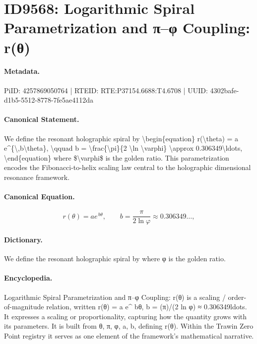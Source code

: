 \section*{ID9568: Logarithmic Spiral Parametrization and π–φ Coupling: r(θ)}
\paragraph{Metadata.}
PiID: 4257869050764 | RTEID: RTE:P37154.6688:T4.6708 | UUID: 4302bafe-d1b5-5512-8778-7fe5ae4112da

\paragraph{Canonical Statement.}
We define the resonant holographic spiral by \textbackslash{}begin\{equation\} r(\textbackslash{}theta) = a e\textasciicircum{}\{\textbackslash{},b\textbackslash{}theta\}, \textbackslash{}qquad b = \textbackslash{}frac\{\textbackslash{}pi\}\{2 \textbackslash{}ln \textbackslash{}varphi\} \textbackslash{}approx 0.306349\textbackslash{}ldots, \textbackslash{}end\{equation\} where \$\textbackslash{}varphi\$ is the golden ratio. This parametrization encodes the Fibonacci-to-helix scaling law central to the holographic dimensional resonance framework.

\paragraph{Canonical Equation.}
\[
r(\theta) = a e^{\,b\theta}, \qquad b = \frac{\pi}{2 \ln \varphi} \approx 0.306349\ldots,
\]

\paragraph{Dictionary.}
We define the resonant holographic spiral by where φ is the golden ratio.

\paragraph{Encyclopedia.}
Logarithmic Spiral Parametrization and π–φ Coupling: r(θ) is a scaling / order-of-magnitude relation, written r(θ) = a e\textasciicircum{} bθ, b = (π)/(2 ln φ) ≈ 0.306349ldots. It expresses a scaling or proportionality, capturing how the quantity grows with its parameters. It is built from θ, π, φ, a, b, defining r(θ). Within the Trawin Zero Point registry it serves as one element of the framework's mathematical narrative.
